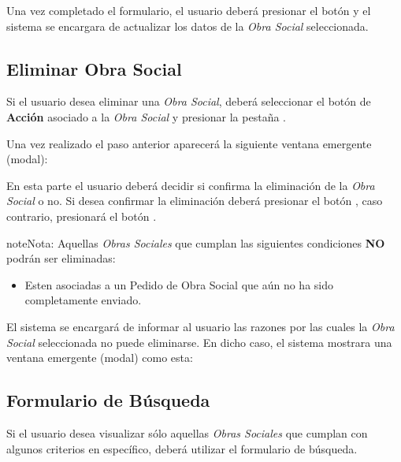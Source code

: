 \documentclass[a4paper,10pt,spanish]{sphinxmanual}
\begin{document}
Una vez completado el formulario, el usuario deberá presionar el botón  y el sistema se encargara de actualizar los datos de la \emph{Obra Social} seleccionada.


\subsection{Eliminar Obra Social}
\label{obrassociales:eliminar-obrasocial}\label{obrassociales:eliminar-obra-social}
Si el usuario desea eliminar una \emph{Obra Social}, deberá seleccionar el botón de \textbf{Acción} asociado a la \emph{Obra Social} y presionar la pestaña .


Una vez realizado el paso anterior aparecerá la siguiente ventana emergente (modal):


En esta parte el usuario deberá decidir si confirma la eliminación de la \emph{Obra Social} o no. Si desea confirmar la eliminación deberá presionar el botón , caso contrario, presionará el botón .

\begin{notice}{note}{Nota:}
Aquellas \emph{Obras Sociales} que cumplan las siguientes condiciones \textbf{NO} podrán ser eliminadas:
\begin{itemize}
\item {} 
Esten asociadas a un Pedido de Obra Social que aún no ha sido completamente enviado.

\end{itemize}

El sistema se encargará de informar al usuario las razones por las cuales la \emph{Obra Social} seleccionada no puede eliminarse. En dicho caso, el sistema mostrara una ventana emergente (modal) como esta:

\end{notice}


\subsection{Formulario de Búsqueda}
\label{obrassociales:formulario-de-busqueda}\label{obrassociales:formulario-busqueda-obrasocial}
Si el usuario desea visualizar sólo aquellas \emph{Obras Sociales} que cumplan con algunos criterios en específico, deberá utilizar el formulario de búsqueda.
\end{document}
